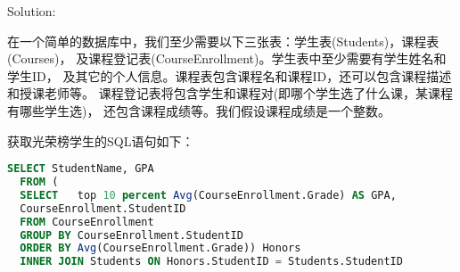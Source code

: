 \begin{description}
Solution: 

在一个简单的数据库中，我们至少需要以下三张表：学生表(Students)，课程表(Courses)， 及课程登记表(CourseEnrollment)。学生表中至少需要有学生姓名和学生ID， 及其它的个人信息。课程表包含课程名和课程ID，还可以包含课程描述和授课老师等。 课程登记表将包含学生和课程对(即哪个学生选了什么课，某课程有哪些学生选)， 还包含课程成绩等。我们假设课程成绩是一个整数。

获取光荣榜学生的SQL语句如下：
\begin{lstlisting}[language=SQL]
  SELECT StudentName, GPA
  FROM (
  SELECT   top 10 percent Avg(CourseEnrollment.Grade) AS GPA,
  CourseEnrollment.StudentID
  FROM CourseEnrollment
  GROUP BY CourseEnrollment.StudentID
  ORDER BY Avg(CourseEnrollment.Grade)) Honors
  INNER JOIN Students ON Honors.StudentID = Students.StudentID
\end{lstlisting}


\end{description}
